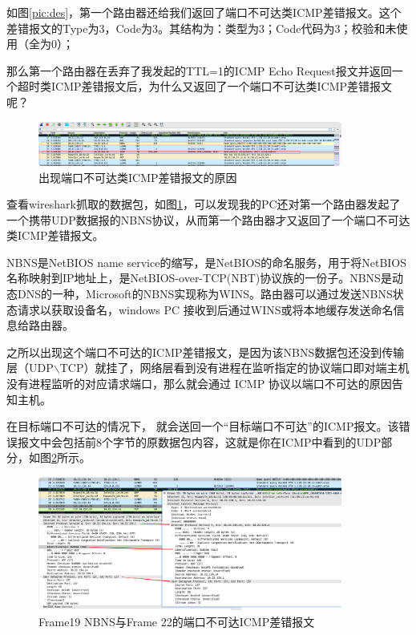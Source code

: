 \documentclass[a4paper,12pt]{report}
\begin{document}
\begin{spacing}{1.5}
如图\ref{pic:des}，第一个路由器还给我们返回了端口不可达类ICMP差错报文。这个差错报文的Type为3，Code为3。其结构为：类型为3；Code代码为3；校验和未使用（全为0）；

那么第一个路由器在丢弃了我发起的TTL=1的ICMP Echo Request报文并返回一个超时类ICMP差错报文后，为什么又返回了一个端口不可达类ICMP差错报文呢？ 

\begin{figure}[htb!]
  \centering
\includegraphics[width=10cm]{figure/nbns.png}
\caption{出现端口不可达类ICMP差错报文的原因}
\label{pic:nbns}
\end{figure}

查看wireshark抓取的数据包，如图\ref{pic:nbns}，可以发现我的PC还对第一个路由器发起了一个携带UDP数据报的NBNS协议，从而第一个路由器才又返回了一个端口不可达类ICMP差错报文。

NBNS是NetBIOS name service的缩写，是NetBIOS的命名服务，用于将NetBIOS名称映射到IP地址上，是NetBIOS-over-TCP(NBT)协议族的一份子。NBNS是动态DNS的一种，Microsoft的NBNS实现称为WINS。路由器可以通过发送NBNS状态请求以获取设备名，windows PC 接收到后通过WINS或将本地缓存发送命名信息给路由器。

之所以出现这个端口不可达的ICMP差错报文，是因为该NBNS数据包还没到传输层（UDP$\backslash$TCP）就挂了，网络层看到没有进程在监听指定的协议端口即对端主机没有进程监听的对应请求端口，那么就会通过 ICMP 协议以端口不可达的原因告知主机。

在目标端口不可达的情况下， 就会送回一个“目标端口不可达”的ICMP报文。该错误报文中会包括前8个字节的原数据包内容，这就是你在ICMP中看到的UDP部分，如图\ref{pic:nbns-com}所示。

\begin{figure}[htb!]
  \centering
\includegraphics[width=10cm]{figure/nbns-com.png}
\caption{Frame19 NBNS与Frame 22的端口不可达ICMP差错报文}
\label{pic:nbns-com}
\end{figure}


\end{spacing}
\end{document}
